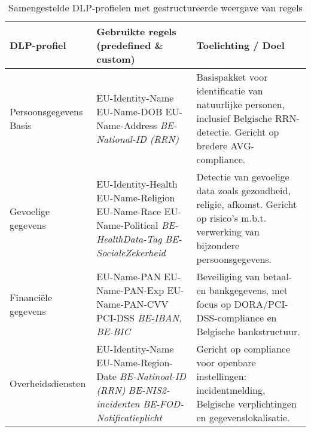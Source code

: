 \begin{table}[h]
    \centering
    \small
    \begin{tabular}{p{3cm}p{5cm}p{6cm}}
        \toprule
        \textbf{DLP-profiel} & \textbf{Gebruikte regels (predefined \& custom)} & \textbf{Toelichting / Doel} \\
        \midrule
        Persoonsgegevens Basis &
        EU-Identity-Name \newline
        EU-Name-DOB \newline
        EU-Name-Address \newline
        \textit{BE-National-ID (RRN)} &
        Basispakket voor identificatie van natuurlijke personen, inclusief Belgische RRN-detectie. Gericht op bredere AVG-compliance. \\
        
        Gevoelige gegevens &
        EU-Identity-Health \newline
        EU-Name-Religion \newline
        EU-Name-Race \newline
        EU-Name-Political \newline
        \textit{BE-HealthData-Tag} \newline
        \textit{BE-SocialeZekerheid} &
        Detectie van gevoelige data zoals gezondheid, religie, afkomst. Gericht op risico’s m.b.t. verwerking van bijzondere persoonsgegevens. \\
        
        Financiële gegevens &
        EU-Name-PAN \newline
        EU-Name-PAN-Exp \newline
        EU-Name-PAN-CVV \newline
        PCI-DSS \newline
        \textit{BE-IBAN, BE-BIC} &
        Beveiliging van betaal- en bankgegevens, met focus op DORA/PCI-DSS-compliance en Belgische bankstructuur. \\
        
        Overheidsdiensten &
        EU-Identity-Name \newline
        EU-Name-Region-Date \newline
        \textit{BE-Natinoal-ID (RRN)} \newline
        \textit{BE-NIS2-incidenten} \newline
        \textit{BE-FOD-Notificatieplicht} &
        Gericht op compliance voor openbare instellingen: incidentmelding, Belgische verplichtingen en gegevenslokalisatie. \\
        \bottomrule
    \end{tabular}
    \caption{Samengestelde DLP-profielen met gestructureerde weergave van regels}
    \label{tab:custom-dlp-profielen}
\end{table}


